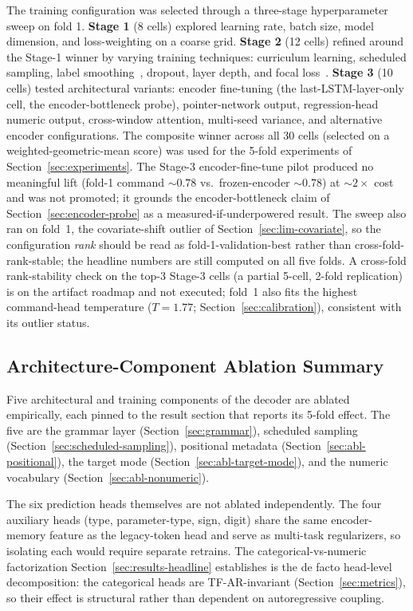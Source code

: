 \documentclass[sensors,article,submit,moreauthors,pdftex]{Definitions/mdpi}
\begin{document}
The training configuration was selected through a three-stage hyperparameter sweep on fold 1.
\textbf{Stage 1} (8 cells) explored learning rate, batch size, model dimension, and loss-weighting on a coarse grid.
\textbf{Stage 2} (12 cells) refined around the Stage-1 winner by varying training techniques: curriculum learning, scheduled sampling, label smoothing~\cite{szegedy2016inception}, dropout, layer depth, and focal loss~\cite{focal_loss}.
\textbf{Stage 3} (10 cells) tested architectural variants: encoder fine-tuning (the last-LSTM-layer-only cell, the encoder-bottleneck probe), pointer-network output, regression-head numeric output, cross-window attention, multi-seed variance, and alternative encoder configurations. The composite winner across all 30 cells (selected on a weighted-geometric-mean score) was used for the 5-fold experiments of Section~\ref{sec:experiments}. The Stage-3 encoder-fine-tune pilot produced no meaningful lift (fold-1 command $\sim\!0.78$ vs.\ frozen-encoder $\sim\!0.78$) at $\sim\!2\times$ cost and was not promoted; it grounds the encoder-bottleneck claim of Section~\ref{sec:encoder-probe} as a measured-if-underpowered result. The sweep also ran on fold~1, the covariate-shift outlier of Section~\ref{sec:lim-covariate}, so the configuration \emph{rank} should be read as fold-1-validation-best rather than cross-fold-rank-stable; the headline numbers are still computed on all five folds. A cross-fold rank-stability check on the top-3 Stage-3 cells (a partial 5-cell, 2-fold replication) is on the artifact roadmap and not executed; fold~1 also fits the highest command-head temperature ($T\!=\!1.77$; Section~\ref{sec:calibration}), consistent with its outlier status.

\subsection{Architecture-Component Ablation Summary}
\label{sec:arch-ablation-summary}

Five architectural and training components of the decoder are ablated empirically, each pinned to the result section that reports its 5-fold effect. The five are the grammar layer (Section~\ref{sec:grammar}), scheduled sampling (Section~\ref{sec:scheduled-sampling}), positional metadata (Section~\ref{sec:abl-positional}), the target mode (Section~\ref{sec:abl-target-mode}), and the numeric vocabulary (Section~\ref{sec:abl-nonumeric}).

The six prediction heads themselves are not ablated independently. The four auxiliary heads (type, parameter-type, sign, digit) share the same encoder-memory feature as the legacy-token head and serve as multi-task regularizers, so isolating each would require separate retrains. The categorical-vs-numeric factorization Section~\ref{sec:results-headline} establishes is the de facto head-level decomposition: the categorical heads are TF-AR-invariant (Section~\ref{sec:metrics}), so their effect is structural rather than dependent on autoregressive coupling.
\end{document}
